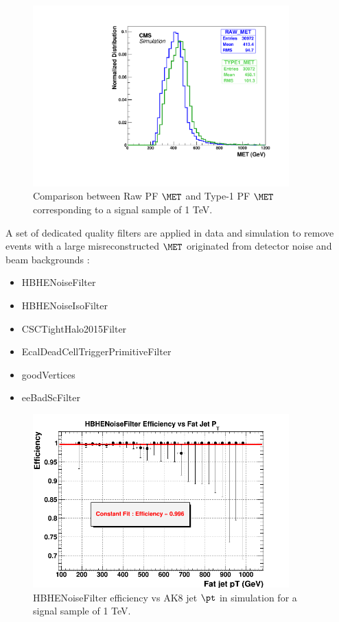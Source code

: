 \begin{figure}[!ht]
\caption{Comparison between Raw PF $\MET$ and Type-1 PF $\MET$ corresponding to a signal sample of 1 TeV.}
\begin{center}
  \includegraphics[width=280pt]{figures/Objects/metcomparison.pdf}
\end{center}
\label{fig:MET}
\end{figure}

A set of dedicated quality filters are applied in data and simulation to remove events with a large misreconstructed $\MET$ originated from detector noise and beam backgrounds \cite{CMS:2016ljj}:

\begin{itemize}
\item
HBHENoiseFilter
\item
HBHENoiseIsoFilter
\item
CSCTightHalo2015Filter
\item
EcalDeadCellTriggerPrimitiveFilter
\item
goodVertices
\item
eeBadScFilter
\end{itemize}

\begin{figure}[!ht]
\caption{HBHENoiseFilter efficiency vs AK8 jet $\pt$ in simulation for a signal sample of 1 TeV.}
\begin{center}
  \includegraphics[width=280pt]{Chapter5_plots/effFilter.png}
\end{center}
\label{fig:METfilter}
\end{figure}

